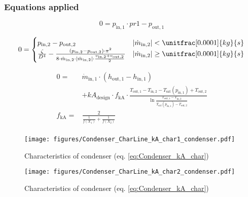 \subsubsection{Equations applied}

\begin{equation}
\label{eq:Condenser_pr1}
0=p_\mathrm{in,1}\cdot pr1 - p_\mathrm{out,1}
\end{equation}

\begin{equation}
\label{eq:Condenser_zeta2}
0 = \begin{cases}
p_\mathrm{in,2}- p_\mathrm{out,2} & |\dot{m}_\mathrm{in,2}| < \unitfrac[0.0001]{kg}{s} \\
\frac{\zeta}{D^4}-\frac{(p_\mathrm{in,2}-p_\mathrm{out,2})\cdot\pi^2}{8\cdot\dot{m}_\mathrm{in,2}\cdot|\dot{m}_\mathrm{in,2}|\cdot\frac{v_\mathrm{in,2} + v_\mathrm{out,2}}{2}}& |\dot{m}_\mathrm{in,2}| \geq \unitfrac[0.0001]{kg}{s}
\end{cases}
\end{equation}

\begin{equation}
\label{eq:Condenser_kA_char}
\begin{split}
0 = & \dot{m}_\mathrm{in,1} \cdot \left( h_\mathrm{out,1} - h_\mathrm{in,1}\right)\\
&+kA_\mathrm{design} \cdot f_\mathrm{kA} \cdot \frac{T_\mathrm{out,1} - T_\mathrm{in,2} - T_\mathrm{sat}\left( p_\mathrm{in,1}\right) +T_\mathrm{out,2}}{\ln{\frac{T_\mathrm{out,1}-T_\mathrm{in,2}}{T_\mathrm{sat}\left( p_\mathrm{in,1}\right)- T_\mathrm{out,2}}}}\\
f_\mathrm{kA}=&\frac{2}{\frac{1}{f\left(X_1\right)}+\frac{1}{f\left(X_2\right)}}\\
\end{split}
\end{equation}

\begin{minipage}{0.5\textwidth}
\begin{figure}[H]\begin{center}
\texttt{[image: figures/Condenser\_CharLine\_kA\_char1\_condenser.pdf]}
\caption{Characteristics of condenser (eq. \ref{eq:Condenser_kA_char})}
\label{fig:CharLine_kA_char1_condenser}
\end{center}\end{figure}

\end{minipage}
\begin{minipage}{0.5\textwidth}
\begin{figure}[H]\begin{center}
\texttt{[image: figures/Condenser\_CharLine\_kA\_char2\_condenser.pdf]}
\caption{Characteristics of condenser (eq. \ref{eq:Condenser_kA_char})}
\label{fig:CharLine_kA_char2_condenser}
\end{center}\end{figure}

\end{minipage}


